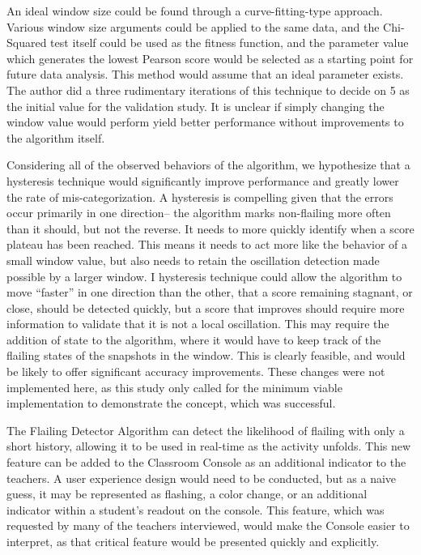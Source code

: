 An ideal window size could be found through a curve-fitting-type approach. Various window size arguments could be applied to the same data, and the Chi-Squared test itself could be used as the fitness function, and the parameter value which generates the lowest Pearson score would be selected as a starting point for future data analysis. This method would assume that an ideal parameter exists. The author did a three rudimentary iterations of this technique to decide on 5 as the initial value for the validation study. It is unclear if simply changing the window value would perform yield better performance without improvements to the algorithm itself.

Considering all of the observed behaviors of the algorithm, we hypothesize that a hysteresis technique would significantly improve performance and greatly lower the rate of mis-categorization. A hysteresis is compelling given that the errors occur primarily in one direction-- the algorithm marks non-flailing more often than it should, but not the reverse. It needs to more quickly identify when a score plateau has been reached. This means it needs to act more like the behavior of a small window value, but also needs to retain the oscillation detection made possible by a larger window. I hysteresis technique could allow the algorithm to move ``faster'' in one direction than the other, that a score remaining stagnant, or close, should be detected quickly, but a score that improves should require more information to validate that it is not a local oscillation. This may require the addition of state to the algorithm, where it would have to keep track of the flailing states of the snapshots in the window. This is clearly feasible, and would be likely to offer significant accuracy improvements. These changes were not implemented here, as this study only called for the minimum viable implementation to demonstrate the concept, which was successful.

The Flailing Detector Algorithm can detect the likelihood of flailing with only a short history, allowing it to be used in real-time as the activity unfolds. This new feature can be added to the Classroom Console as an additional indicator to the teachers. A user experience design would need to be conducted, but as a naive guess, it may be represented as flashing, a color change, or an additional indicator within a student's readout on the console. This feature, which was requested by many of the teachers interviewed, would make the Console easier to interpret, as that critical feature would be presented quickly and explicitly.



